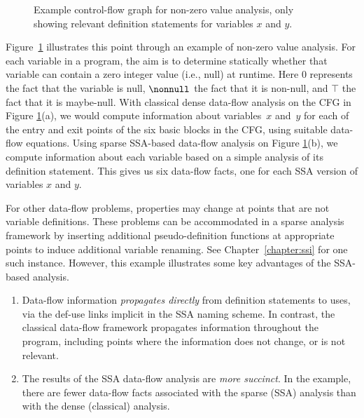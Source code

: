 \begin{figure}[t]%
  \caption{Example control-flow graph for   non-zero value analysis, only showing relevant definition statements for   variables $x$ and $y$.}
  \label{fig:part1-vanilla-cfgexample}
\end{figure}

Figure~\ref{fig:part1-vanilla-cfgexample} illustrates this point through an example of non-zero value analysis. 
For each variable in a program, the aim is to determine statically whether that variable can contain a zero integer value (i.e., null) at runtime. 
Here $0$ represents the fact that the variable is null, $\nonnull$ the fact that it is non-null, and $\top$ the fact that it is maybe-null. 
With classical dense data-flow analysis on the CFG in Figure \ref{fig:part1-vanilla-cfgexample}(a), we would compute information about variables~$x$ and~$y$ for each of the entry and exit points of the six basic blocks in the CFG, using suitable data-flow equations. 
Using sparse SSA-based data-flow analysis on Figure \ref{fig:part1-vanilla-cfgexample}(b), we compute information about each variable based on a simple analysis of its definition statement. 
This gives us six data-flow facts, one for each SSA version of variables $x$ and $y$.

For other data-flow problems, properties may change at points that are not variable definitions. 
These problems can be accommodated in a sparse analysis framework by inserting additional pseudo-definition functions at appropriate points to induce additional variable renaming. 
See Chapter~\ref{chapter:ssi} for one such instance.
%
However, this example illustrates some key advantages of the SSA-based analysis.
\begin{enumerate} \item Data-flow information \textit{propagates directly} from definition statements to uses, via the def-use links implicit in the SSA naming scheme. 
In contrast, the classical data-flow framework propagates information throughout the program, including points where the information does not change, or is not relevant.
\item The results of the SSA data-flow analysis are \textit{more succinct}. 
In the example, there are fewer data-flow facts associated with the sparse (SSA) analysis than with the dense (classical) analysis.
\end{enumerate}

